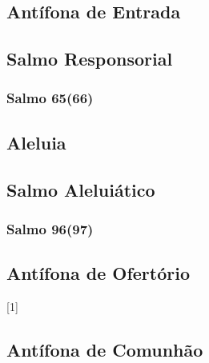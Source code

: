 \subsection{Antífona de Entrada}\label{subsection:tempus-per-annum/missa-1/introitus}

\AllowPageFlush

\subsection[Salmo Responsorial]{Salmo Responsorial}\label{subsection:tempus-per-annum/missa-1/psalmus-responsorius}
\subsubsection{Salmo 65(66)}

\AllowPageFlush

\subsection{Aleluia}\label{subsection:tempus-per-annum/missa-1/alleluia}

\AllowPageFlush

\subsection[Salmo Aleluiático]{Salmo Aleluiático}\label{subsection:tempus-per-annum/missa-1/psalmus-alleluiaticus}
\subsubsection{Salmo 96(97)}

\AllowPageFlush

\subsection{Antífona de Ofertório}\label{subsection:tempus-per-annum/missa-1/offertorium}
[1]

\AllowPageFlush

\subsection{Antífona de Comunhão}\label{subsection:tempus-per-annum/missa-1/communio}

\AllowPageFlush